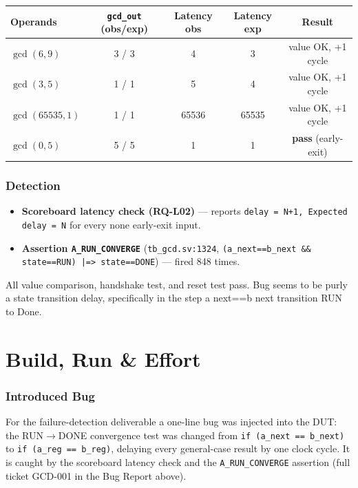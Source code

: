 \documentclass[11pt,a4paper]{article}
\begin{document}
{\begin{table}[H]
\centering
\small
\begin{tabular}{lcccc}
\toprule
Operands & \texttt{gcd\_out} (obs/exp) & Latency obs & Latency exp & Result \\
\midrule
$\gcd(6,9)$       & 3 / 3 & 4      & 3      & value OK, +1 cycle \\
$\gcd(3,5)$       & 1 / 1 & 5      & 4      & value OK, +1 cycle \\
$\gcd(65535,1)$   & 1 / 1 & 65536  & 65535  & value OK, +1 cycle \\
$\gcd(0,5)$       & 5 / 5 & 1      & 1      & \textbf{pass} (early-exit) \\
\bottomrule
\end{tabular}
\end{table}

\section*{Detection}
\begin{itemize}\itemsep2pt
  \item \textbf{Scoreboard latency check (RQ-L02)} --- reports
        \texttt{delay = N+1, Expected delay = N} for every none early-exit input.
  \item \textbf{Assertion \texttt{A\_RUN\_CONVERGE}} (\texttt{tb\_gcd.sv:1324},
        \texttt{(a\_next==b\_next \&\& state==RUN) |=> state==DONE}) --- fired
        848 times.
\end{itemize}

All value comparison, handshake test, and reset test pass. Bug seems to be purly a state transition delay, specifically in the step a next==b next transition RUN to Done.

\newpage
\part{Build, Run \& Effort}

\section{Introduced Bug}
For the failure-detection deliverable a one-line bug was injected into the DUT: the
RUN$\to$DONE convergence test was changed from \texttt{if (a\_next == b\_next)} to
\texttt{if (a\_reg == b\_reg)}, delaying every general-case result by one clock cycle.
It is caught by the scoreboard latency check and the \texttt{A\_RUN\_CONVERGE} assertion
(full ticket GCD-001 in the Bug Report above).

}
\end{document}
